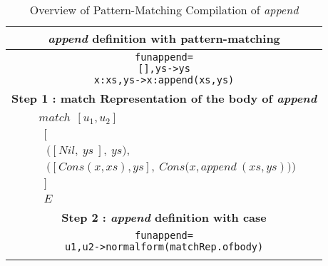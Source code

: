 \documentclass[11pt]{article}
\begin{document}
\begin{table}[h!]
\begin{center}
\begin{tabular}{|c|} \hline
{\bf \textit{append} definition with pattern-matching} \\ 
\hline
\begin{minipage}{2.2in}
\begin{alltt}


fun append = 
  [],   ys   -> ys 
  x:xs, ys   -> x:append (xs,ys) 


\end{alltt}
\end {minipage} \\ 
\hline
{\bf Step 1 : match Representation of the body of \textit{append}} \\ 
\hline
\begin{minipage}{3in}
{
\begin{align*} 
&match~~[u_1,u_2] \\
&~~\bigg[\\ 
&~~~ \Big([Nil,~ys~],~ys\Big),\\
&~~~ \Big([Cons(x,xs),ys],~Cons\big(x,append~(xs,ys)\big)\Big)~\\ 
&~~ \bigg ]\\ 
&~~E
\end{align*}
}
\end {minipage}\\

\hline 
{\bf Step 2 : \textit{append} definition with case}\\ 
\hline
\begin{minipage}{3in}
\begin{alltt}


fun append = 
  u1,u2 -> normal form (match Rep. of body)


\end{alltt}
\end {minipage}\\

\tabularnewline
\hline
\end{tabular}
\caption{Overview of Pattern-Matching Compilation of \textit{append}}
\label{Pmatch:Ex1StepbyStepTopLevel}
\end{center}
\end{table}
\end{document}
